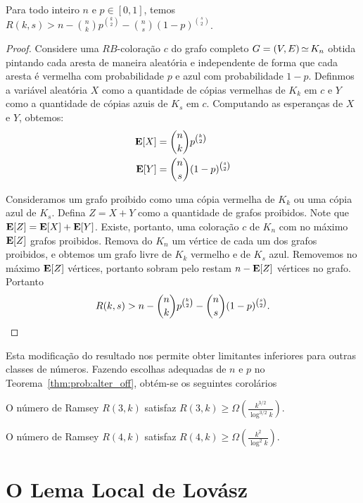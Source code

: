 \begin{theorem}
\label{thm:prob:alter_off}
Para todo inteiro $n$ e $p \in [0,1]$, temos $\displaystyle R(k, s) > n - \binom{n}{k}p^{\binom{k}{2}} - \binom{n}{s}(1-p)^{\binom{s}{2}}$.
\end{theorem}
\begin{proof}
Considere uma $RB$-coloração $c$ do grafo completo $G = (V,E) \operatorname{\simeq} K_n$ obtida pintando cada aresta de maneira aleatória e independente de forma que cada aresta é vermelha com probabilidade $p$ e azul com probabilidade $1-p$.
Definmos a variável aleatória $X$ como a quantidade de cópias vermelhas de $K_k$ em $c$ e $Y$ como a quantidade de cópias azuis de $K_s$ em $c$. Computando as esperanças de $X$ e $Y$, obtemos:
\begin{align*}
\operatorname{\mathbf{E}}[X] &= \binom{n}{k}p^{\binom{k}{2}} \\
\operatorname{\mathbf{E}}[Y] &= \binom{n}{s}(1-p)^{\binom{s}{2}}
\end{align*}

Consideramos um grafo proibido como uma cópia vermelha de $K_k$ ou uma cópia azul de $K_s$. Defina $Z = X + Y$ como a quantidade de grafos proibidos. Note que $\operatorname{\mathbf{E}}[Z] = \operatorname{\mathbf{E}}[X] + \operatorname{\mathbf{E}}[Y]$. Existe, portanto, uma coloração $c$ de $K_n$ com no máximo $\operatorname{\mathbf{E}}[Z]$ grafos proibidos. Remova do $K_n$ um vértice de cada um dos grafos proibidos, e obtemos um grafo livre de $K_k$ vermelho e de $K_s$ azul. Removemos no máximo $\operatorname{\mathbf{E}}[Z]$ vértices, portanto sobram pelo restam $n - \operatorname{\mathbf{E}}[Z] $ vértices no grafo. Portanto
\[ R(k, s) > n - \binom{n}{k}p^{\binom{k}{2}} - \binom{n}{s}(1-p)^{\binom{s}{2}}.  \qedhere\]
\end{proof}

Esta modificação do resultado nos permite obter limitantes inferiores para outras classes de números. Fazendo escolhas adequadas de $n$ e $p$ no Teorema~\ref{thm:prob:alter_off}, obtém-se os seguintes corolários

\begin{corollary}
O número de Ramsey $R(3,k)$ satisfaz $\displaystyle R(3,k) \geq  \Omega\left( \frac{k^{3/2}}{\log^{3/2} k}\right)$.
\end{corollary}

\begin{corollary}
O número de Ramsey $R(4,k)$ satisfaz $\displaystyle R(4,k) \geq  \Omega\left( \frac{k^2}{\log^2 k}\right)$.
\end{corollary}


\section{O Lema Local de Lovász}

